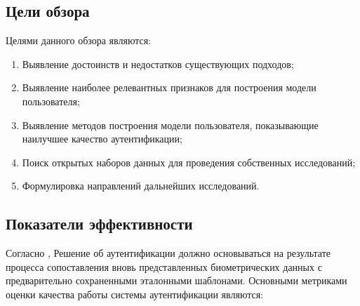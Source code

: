 \documentclass[12pt]{article}
\begin{document}
    \subsection{Цели обзора}
    \label{sec:Overview:Goals}

    \par Целями данного обзора являются:

    \begin{enumerate}
        \item Выявление достоинств и недостатков существующих подходов;
        \item Выявление наиболее релевантных признаков для построения модели пользователя;
        \item Выявление методов построения модели пользователя, показывающие наилучшее качество аутентификации;
        \item Поиск открытых наборов данных для проведения собственных исследований;
        \item Формулировка направлений дальнейших исследований.
    \end{enumerate}


    \subsection{Показатели эффективности}
    \label{sec:Overview:Metrics}

    \par Согласно \cite{BiometricRecognition, BoiometricSecurity}, Решение об аутентификации должно основываться на результате процесса сопоставления вновь представленных биометрических данных с предварительно сохраненными эталонными шаблонами. Основными метриками оценки качества работы системы аутентификации являются:
\end{document}
